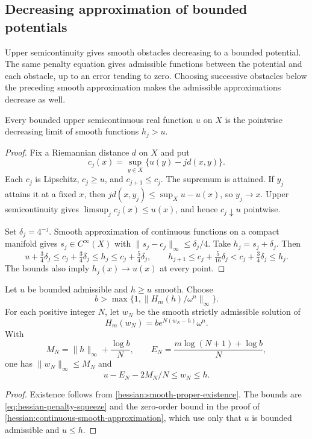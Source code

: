 \subsection{Decreasing approximation of bounded potentials}
\label{subsec:hessian-bounded-approximation}

Upper semicontinuity gives smooth obstacles decreasing to a bounded
potential. The same penalty equation gives admissible functions between
the potential and each obstacle, up to an error tending to zero.
Choosing successive obstacles below the preceding smooth approximation
makes the admissible approximations decrease as well.

\begin{lemma}\label{hessian:smooth-majorants}
Every bounded upper semicontinuous real function $u$ on $X$ is the
pointwise decreasing limit of smooth functions $h_j>u$.
\end{lemma}
\begin{proof}
Fix a Riemannian distance $d$ on $X$ and put
\[
 c_j(x)=\sup_{y\in X}\{u(y)-j d(x,y)\}.
\]
Each $c_j$ is Lipschitz, $c_j\geq u$, and $c_{j+1}\leq c_j$.
The supremum is attained. If $y_j$ attains it at a fixed $x$, then
$j d(x,y_j)\leq\sup_X u-u(x)$, so $y_j\to x$.
Upper semicontinuity gives $\limsup_j c_j(x)\leq u(x)$, and hence
$c_j\downarrow u$ pointwise.

Set $\delta_j=4^{-j}$. Smooth approximation of continuous functions
on a compact manifold gives $s_j\in C^\infty(X)$ with
$\|s_j-c_j\|_\infty\leq\delta_j/4$.
Take $h_j=s_j+\delta_j$. Then
\[
 u+\tfrac34\delta_j\leq c_j+\tfrac34\delta_j\leq h_j
                     \leq c_j+\tfrac54\delta_j,
 \qquad
 h_{j+1}\leq c_j+\tfrac5{16}\delta_j
                    < c_j+\tfrac34\delta_j\leq h_j.
\]
The bounds also imply $h_j(x)\to u(x)$ at every point.
\end{proof}

\begin{lemma}\label{hessian:bounded-penalty-squeeze}
Let $u$ be bounded admissible and $h\geq u$ smooth. Choose
\[
 b>\max\{1,\|H_m(h)/\omega^n\|_\infty\}.
\]
For each positive integer $N$, let $w_N$ be the smooth strictly
admissible solution of
\[
 H_m(w_N)=b e^{N(w_N-h)}\omega^n.
\]
With
\[
 M_N=\|h\|_\infty+\frac{\log b}{N},\qquad
 E_N=\frac{m\log(N+1)+\log b}{N},
\]
one has $\|w_N\|_\infty\leq M_N$ and
\[
 u-E_N-2M_N/N\leq w_N\leq h.
\]
\end{lemma}
\begin{proof}
Existence follows from \cref{hessian:smooth-proper-existence}. The
bounds are \eqref{eq:hessian-penalty-squeeze} and the zero-order bound in
the proof of \cref{hessian:continuous-smooth-approximation}, which use
only that $u$ is bounded admissible and $u\leq h$.
\end{proof}

